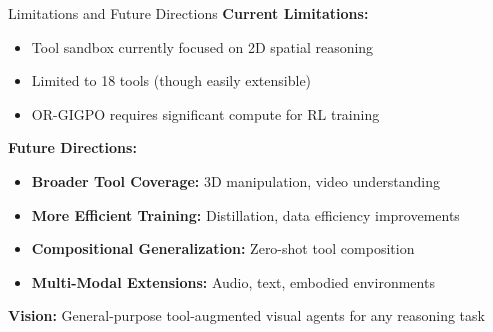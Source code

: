 \documentclass[aspectratio=169,xcolor=dvipsnames]{beamer}
\begin{document}
\begin{frame}{Limitations and Future Directions}
\textbf{Current Limitations:}
\begin{itemize}
    \item Tool sandbox currently focused on 2D spatial reasoning
    \item Limited to 18 tools (though easily extensible)
    \item OR-GIGPO requires significant compute for RL training
\end{itemize}

\vspace{1em}

\textbf{Future Directions:}
\begin{itemize}
    \item \textbf{Broader Tool Coverage:} 3D manipulation, video understanding
    \item \textbf{More Efficient Training:} Distillation, data efficiency improvements
    \item \textbf{Compositional Generalization:} Zero-shot tool composition
    \item \textbf{Multi-Modal Extensions:} Audio, text, embodied environments
\end{itemize}

\vspace{1em}
\centering
\colorbox{neuripsblue!20}{\parbox{0.85\textwidth}{\centering
\textbf{Vision:} General-purpose tool-augmented visual agents for any reasoning task
}}
\end{frame}
\end{document}
